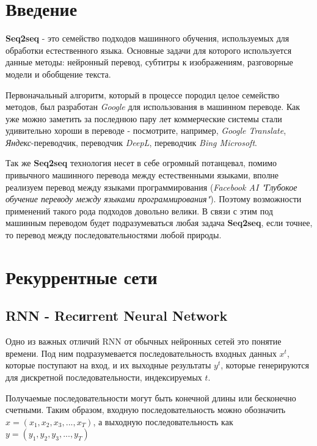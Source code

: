 \documentclass[a4paper,russian]{article}
\begin{document}
	
	
	
	\section{Введение}
	
	\textbf{Seq2seq} - это семейство подходов машинного обучения, используемых для обработки естественного языка. Основные задачи для которого используется данные методы: нейронный перевод, субтитры к изображениям, разговорные модели и обобщение текста.
	
	Первоначальный алгоритм, который в процессе породил целое семейство методов, был разработан \textit{Google} для использования в машинном переводе. Как уже можно заметить за последнюю пару лет коммерческие системы стали удивительно хороши в  переводе - посмотрите, например, \textit{Google Translate}, \textit{Яндекс}-переводчик, переводчик \textit{DeepL}, переводчик \textit{Bing Microsoft}.
	
	Так же \textbf{Seq2seq} технология несет в себе огромный потанцевал, помимо привычного машинного перевода между естественными языками, вполне реализуем перевод между языками программирования (\textit{Facebook AI "Глубокое обучение переводу между языками программирования"}). Поэтому возможности применений такого рода подходов довольно велики. В связи с этим под машинным переводом будет подразумеваться любая задача \textbf{Seq2seq}, если точнее, то перевод между последовательностями любой природы.
	
	\clearpage
	
	\section{Рекуррентные сети}
	
	\subsection{RNN - Recиrrent Neural Network}
	
	Одно из важных отличий RNN от обычных нейронных сетей это понятие времени. Под ним подразумевается последовательность входных данных $x^t$, которые поступают на вход, и их выходные результаты $y^t$, которые генерируются для дискретной последовательности, индексируемых $t$. 
	
	Получаемые последовательности могут быть конечной длины или бесконечно счетными. Таким образом, входную последовательность можно обозначить $x = (x_1, x_2, x_3, ... , x_T)$, а выходную последовательность как $y = (y_1, y_2, y_3, ... , y_T)$
	
\end{document}
